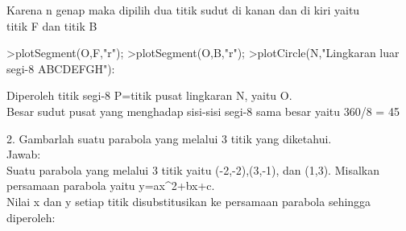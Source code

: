 \documentclass{article}
\begin{document}
\begin{eulernotebook}
\begin{eulercomment}
\begin{eulercomment}
\begin{eulercomment}
\begin{eulercomment}
\begin{eulerprompt}
\end{eulerprompt}
\begin{eulercomment}
Karena n genap maka dipilih dua titik sudut di kanan dan di kiri yaitu\\
titik F dan titik B
\end{eulercomment}
\begin{eulerprompt}
>plotSegment(O,F,"r");
>plotSegment(O,B,"r");
>plotCircle(N,"Lingkaran luar segi-8 ABCDEFGH"):
\end{eulerprompt}
\begin{eulercomment}
Diperoleh titik segi-8 P=titik pusat lingkaran N, yaitu O.\\
Besar sudut pusat yang menghadap sisi-sisi segi-8 sama besar yaitu
360/8 = 45


2. Gambarlah suatu parabola yang melalui 3 titik yang diketahui.\\
Jawab:\\
Suatu parabola yang melalui 3 titik yaitu (-2,-2),(3,-1), dan (1,3).
Misalkan persamaan parabola yaitu y=ax\textasciicircum{}2+bx+c.\\
Nilai x dan y setiap titik disubstitusikan ke persamaan parabola
sehingga diperoleh:


\end{eulercomment}
\end{eulercomment}
\end{eulercomment}
\end{eulercomment}
\end{eulercomment}
\end{eulernotebook}
\end{document}

